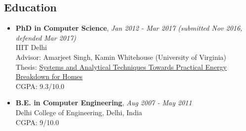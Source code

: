\documentclass[letter,10pt]{article}
\begin{document}
\subsection*{{\sc \textbf{Education}}\hspace{5pt}\noindent\hrulefill}
\begin{itemize}
\item[] 
    \textbf{PhD in Computer Science}, \hfill \textit{Jan 2012 - Mar 2017 (submitted Nov 2016, defended Mar 2017)}\\
	IIIT Delhi \\
	Advisor: Amarjeet Singh, Kamin Whitehouse (University of Virginia) \\
	Thesis: \href{https://nipunbatra.github.io/papers/batra_thesis.pdf}{Systems and Analytical Techniques Towards Practical Energy Breakdown for Homes}\\
	CGPA: 9.3/10.0
\item[]
	\textbf{B.E. in Computer Engineering}, \hfill \textit{Aug 2007 - May 2011}\\
	Delhi College of Engineering, Delhi, India \\
	CGPA: 9/10.0

\end{itemize}
\end{document}

